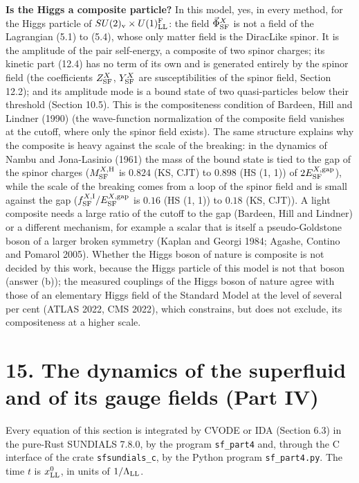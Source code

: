 \documentclass[
  10pt,
]{article}
\begin{document}
\textbf{Is the Higgs a composite particle?} In this model, yes, in every
method, for the Higgs particle of
\(SU(2)_{\rm v}\times U(1)^{\rm F}_{\rm LL}\): the field
\(\vec\Phi^X_{\rm SF}\) is not a field of the Lagrangian (5.1) to (5.4),
whose only matter field is the DiracLike spinor. It is the amplitude of
the pair self-energy, a composite of two spinor charges; its kinetic
part (12.4) has no term of its own and is generated entirely by the
spinor field (the coefficients \(Z^X_{\rm SF}\), \(Y^X_{\rm SF}\) are
susceptibilities of the spinor field, Section 12.2); and its amplitude
mode is a bound state of two quasi-particles below their threshold
(Section 10.5). This is the compositeness condition of Bardeen, Hill and
Lindner (1990) (the wave-function normalization of the composite field
vanishes at the cutoff, where only the spinor field exists). The same
structure explains why the composite is heavy against the scale of the
breaking: in the dynamics of Nambu and Jona-Lasinio (1961) the mass of
the bound state is tied to the gap of the spinor charges
(\(M^{X,{\rm H}}_{\rm SF}\) is \(0.824\) (KS, CJT) to \(0.898\) (HS (1,
1)) of \(2E^{X,{\rm gap}}_{\rm SF}\)), while the scale of the breaking
comes from a loop of the spinor field and is small against the gap
(\(f^{X,{\rm I}}_{\rm SF}/E^{X,{\rm gap}}_{\rm SF}\) is \(0.16\) (HS (1,
1)) to \(0.18\) (KS, CJT)). A light composite needs a large ratio of the
cutoff to the gap (Bardeen, Hill and Lindner) or a different mechanism,
for example a scalar that is itself a pseudo-Goldstone boson of a larger
broken symmetry (Kaplan and Georgi 1984; Agashe, Contino and Pomarol
2005). Whether the Higgs boson of nature is composite is not decided by
this work, because the Higgs particle of this model is not that boson
(answer (b)); the measured couplings of the Higgs boson of nature agree
with those of an elementary Higgs field of the Standard Model at the
level of several per cent (ATLAS 2022, CMS 2022), which constrains, but
does not exclude, its compositeness at a higher scale.

\hypertarget{the-dynamics-of-the-superfluid-and-of-its-gauge-fields-part-iv}{%
\section{15. The dynamics of the superfluid and of its gauge fields
(Part
IV)}\label{the-dynamics-of-the-superfluid-and-of-its-gauge-fields-part-iv}}

Every equation of this section is integrated by CVODE or IDA (Section
6.3) in the pure-Rust SUNDIALS 7.8.0, by the program \texttt{sf\_part4}
and, through the C interface of the crate \texttt{sfsundials\_c}, by the
Python program \texttt{sf\_part4.py}. The time \(t\) is
\(x^0_{\rm LL}\), in units of \(1/\Lambda_{\rm LL}\).
\end{document}
